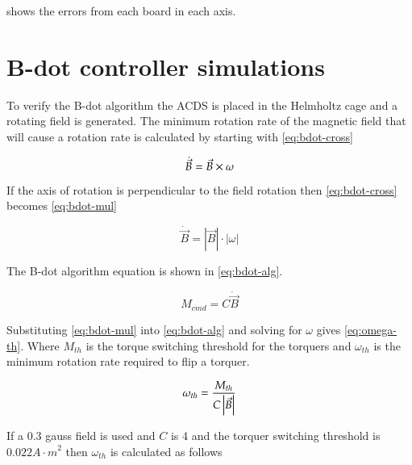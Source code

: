 shows the errors from each board in each axis.

\section{B-dot controller simulations}

To verify the B-dot algorithm the \ac{ACDS} is placed in the Helmholtz cage and a rotating field is generated. The minimum rotation rate of the magnetic field that will cause a rotation rate is calculated by starting with \cref{eq:bdot-cross}

\begin{equation}
    \dot{\vec{B}} = \vec{B} \times \omega
    \label{eq:bdot-cross}
\end{equation}

If the axis of rotation is perpendicular to the field rotation then \cref{eq:bdot-cross} becomes \cref{eq:bdot-mul}

\begin{equation}
    \dot{\vec{B}} = \left| \vec{B} \right| \cdot \left| \omega \right|
    \label{eq:bdot-mul}
\end{equation}

The B-dot algorithm equation is shown in \cref{eq:bdot-alg}.

\begin{equation}
    M_{cmd} = C \dot{\vec{B}} 
    \label{eq:bdot-alg}
\end{equation}

Substituting \cref{eq:bdot-mul} into \cref{eq:bdot-alg} and solving for $\omega$ gives \cref{eq:omega-th}. Where $M_{th}$ is the torque switching threshold for the torquers and $\omega_{th}$ is the minimum rotation rate required to flip a torquer.


\begin{equation}
    \omega _ {th} = {M _ {th} \over{ {C \left| \vec{B} \right|}}}
    \label{eq:omega-th}
\end{equation}

If a 0.3 gauss field is used and $C$ is 4 and the torquer switching threshold is $0.022 \unit{A \cdot m} ^2$ then $\omega_{th}$ is calculated as follows

